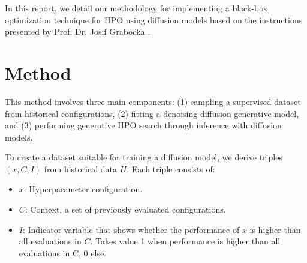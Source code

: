 \documentclass[10pt,a4paper,twocolumn]{article}
\begin{document}
{In this report, we detail our methodology for implementing a black-box optimization technique for HPO using diffusion models based on the instructions presented by Prof. Dr. Josif Grabocka \cite{grabocka2024diffusers}.
\section{Method} 
This method involves three main components: (1) sampling a supervised dataset from historical configurations, (2) fitting a denoising diffusion generative model, and (3) performing generative HPO search through inference with diffusion models.

To create a dataset suitable for training a diffusion model, we derive triples \((x, C, I)\) from historical data \(H\). Each triple consists of:
\begin{itemize}
  \item \(x\): Hyperparameter configuration.
  \item \(C\): Context, a set of previously evaluated configurations.
  \item \(I\): Indicator variable that shows whether the performance of \(x\) is higher than all evaluations in \(C\). Takes value 1 when performance is higher than all evaluations in C, 0 else.
\end{itemize}

}
\end{document}
